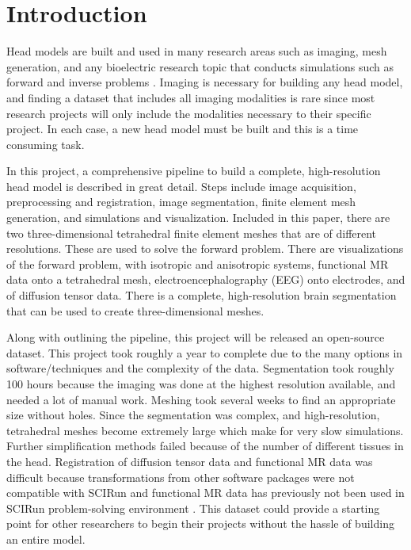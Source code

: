 
\section{Introduction}
\label{sec:intro}

Head models are built and used in many research areas such as imaging, mesh generation, and any bioelectric research topic that conducts simulations such as forward and inverse problems \cite{ref:Brette2012}. Imaging is necessary for building any head model, and finding a dataset that includes all imaging modalities is rare since most research projects will only include the modalities necessary to their specific project. In each case, a new head model must be built and this is a time consuming task.

In this project, a comprehensive pipeline to build a complete, high-resolution head model is described in great detail. Steps include image acquisition, preprocessing and registration, image segmentation, finite element mesh generation, and simulations and visualization. Included in this paper, there are two three-dimensional tetrahedral finite element meshes that are of different resolutions. These are used to solve the forward problem. There are visualizations of the forward problem, with isotropic and anisotropic systems, functional MR data onto a tetrahedral mesh, electroencephalography (EEG) onto electrodes, and of diffusion tensor data. There is a complete, high-resolution brain segmentation that can be used to create three-dimensional meshes. 

Along with outlining the pipeline, this project will be released an open-source dataset. This project took roughly a year to complete due to the many options in software/techniques and the complexity of the data. Segmentation took roughly 100 hours because the imaging was done at the highest resolution available, and needed a lot of manual work. Meshing took several weeks to find an appropriate size without holes. Since the segmentation was complex, and high-resolution, tetrahedral meshes become extremely large which make for very slow simulations. Further simplification methods failed because of the number of different tissues in the head. Registration of diffusion tensor data and functional MR data was difficult because transformations from other software packages were not compatible with SCIRun and functional MR data has previously not been used in SCIRun problem-solving environment \cite{ref:scirun}. This dataset could provide a starting point for other researchers to begin their projects without the hassle of building an entire model. 